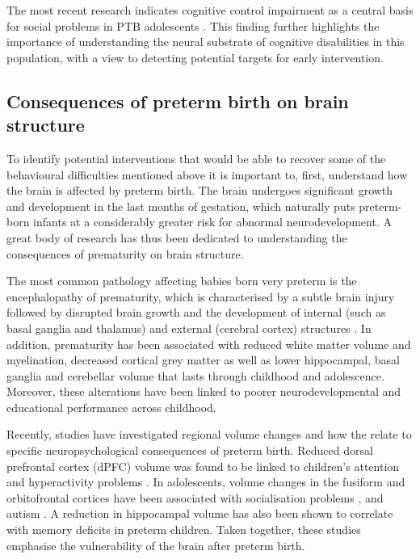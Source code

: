 The most recent research indicates cognitive control impairment as a central basis for social problems in PTB adolescents \citep{Twilhaar2019}. This finding further highlights the importance of understanding the neural substrate of cognitive disabilities in this population, with a view to detecting potential targets for early intervention. 


\subsection{Consequences of preterm birth on brain structure}

To identify potential interventions that would be able to recover some of the behavioural difficulties mentioned above it is important to, first, understand how the brain is affected by preterm birth. The brain undergoes significant growth and development in the last months of gestation, which naturally puts preterm-born infants at a considerably greater risk for abnormal neurodevelopment. A great body of research has thus been dedicated to understanding the consequences of prematurity on brain structure.

The most common pathology affecting babies born very preterm is the encephalopathy of prematurity, which is characterised by a subtle brain injury followed by disrupted brain growth and the development of internal (such as basal ganglia and thalamus) and external (cerebral cortex) structures \citep{Kunz2014}. In addition, prematurity has been associated with reduced white matter volume and myelination, decreased cortical grey matter as well as lower hippocampal, basal ganglia and cerebellar volume that lasts through childhood and adolescence. Moreover, these alterations have been linked to poorer neurodevelopmental \citep{Inder2005,Ment2009,Nosarti2013,Padilla2015} and educational \citep{Cheong2013} performance across childhood.

 Recently, studies have investigated regional volume changes and how the relate to specific neuropsychological consequences of preterm birth. Reduced dorsal prefrontal cortex (dPFC) volume was found to be linked to children's attention and hyperactivity problems \citep{Bora2014}. In adolescents, volume changes in the fusiform and orbitofrontal cortices have been associated with socialisation problems \citep{Healy2013}, and autism \citep{Johnson2014}. A reduction in hippocampal volume has also been shown to correlate with memory deficits in preterm children. Taken together, these studies emphasise the vulnerability of the brain after preterm birth.

